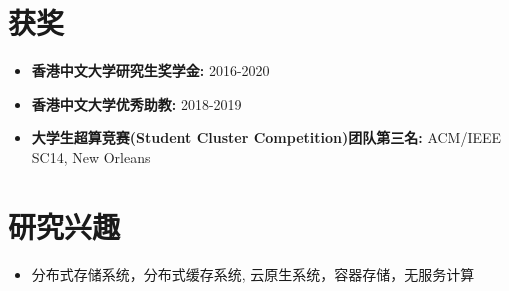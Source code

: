 \documentclass[letterpaper,11pt]{article}
\newcommand{\resumeItem}[2]{
  \item\small{
    \textbf{#1}{ #2 \vspace{-2pt}}
  }
}
\newcommand{\resumeSubItem}[2]{\resumeItem{#1}{#2}\vspace{-4pt}}
\newcommand{\resumeSubHeadingListStart}{\begin{itemize}[leftmargin=*]}
\newcommand{\resumeSubHeadingListEnd}{\end{itemize}}
\begin{document}

\section{获奖}
  \resumeSubHeadingListStart
    \resumeSubItem{香港中文大学研究生奖学金:}{2016-2020}
    \resumeSubItem{香港中文大学优秀助教:}{2018-2019}
    \resumeSubItem{大学生超算竞赛(Student Cluster Competition)团队第三名:}{ACM/IEEE SC14, New Orleans}
  \resumeSubHeadingListEnd
% 

\section{研究兴趣}
  \resumeSubHeadingListStart
  \resumeSubItem{}{分布式存储系统，分布式缓存系统, 云原生系统，容器存储，无服务计算}
  \resumeSubHeadingListEnd
    
\end{document}

